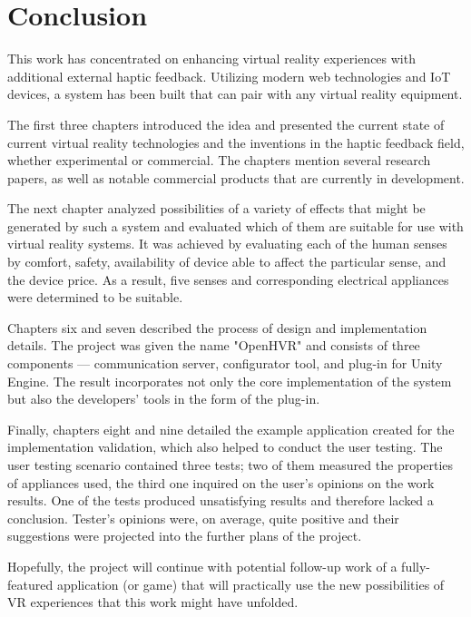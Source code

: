 \chapter{Conclusion}

This work has concentrated on enhancing virtual reality experiences with 
additional external haptic feedback. Utilizing modern web technologies and 
IoT devices, a system has been built that can pair with any virtual reality 
equipment.

The first three chapters introduced the idea and presented the current state 
of current virtual reality technologies and the inventions in the haptic 
feedback field, whether experimental or commercial. The chapters mention 
several research papers, as well as notable commercial products that are 
currently in development.

The next chapter analyzed possibilities of a variety of effects that might 
be generated by such a system and evaluated which of them are suitable 
for use with virtual reality systems. It was achieved by evaluating each 
of the human senses by comfort, safety, availability of device able to affect 
the particular sense, and the device price. As a result, five senses 
and corresponding electrical appliances were determined to be suitable.

Chapters six and seven described the process of design and implementation 
details. The project was given the name "OpenHVR" and consists of three 
components — communication server, configurator tool, and plug-in for Unity 
Engine. The result incorporates not only the core implementation of 
the system but also the developers' tools in the form of the plug-in.

Finally, chapters eight and nine detailed the example application created 
for the implementation validation, which also helped to conduct the user 
testing. The user testing scenario contained three tests; two of them measured 
the properties of appliances used, the third one inquired on the user's opinions
on the work results. One of the tests produced unsatisfying results 
and therefore lacked a conclusion. Tester's opinions were, on average, 
quite positive and their suggestions were projected into the 
further plans of the project.

Hopefully, the project will continue with potential follow-up work of a 
fully-featured application (or game) that will practically use the new 
possibilities of VR experiences that this work might have unfolded.